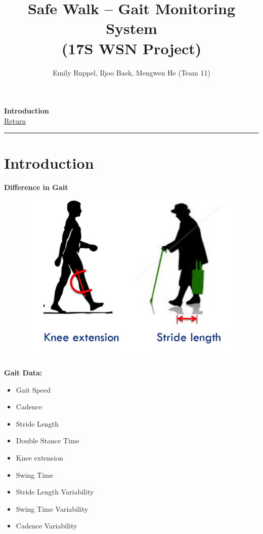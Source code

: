 \documentclass[letterpaper,12pt]{article}
\title{\textbf{Safe Walk -- Gait Monitoring System\\\small (17S WSN Project)}}
\author{Emily Ruppel, Iljoo Baek, Mengwen He (Team 11)}
\newcommand{\panhline}{\begin{center}\rule{\textwidth}{1pt}\end{center}}
\begin{document}
\maketitle

\textbf{Introduction}\\
\href{../index.html}{Return}
\panhline
\section{Introduction}

\textbf{Difference in Gait}
\begin{figure}[!h]
	\centering
	\includegraphics[width=15cm]{./imgs/gait.png}
\end{figure}

\textbf{Gait Data:}
\begin{itemize}
	\item Gait Speed
	\item Cadence
	\item Stride Length
	\item Double Stance Time
	\item Knee extension
	\item Swing Time
	\item Stride Length Variability
	\item Swing Time Variability 
	\item Cadence Variability	
\end{itemize}
\end{document}
